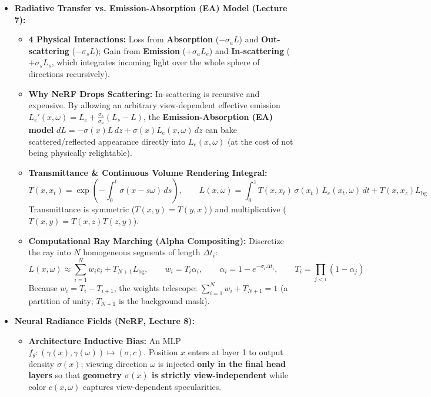 \documentclass[11pt,a4paper]{article}
\theoremstyle{definition}
\theoremstyle{plain}
\theoremstyle{remark}
\begin{document}
\begin{itemize}
    \item \textbf{Radiative Transfer vs. Emission-Absorption (EA) Model (Lecture 7):}
    \begin{itemize}
        \item \textbf{4 Physical Interactions:} Loss from \textbf{Absorption} ($-\sigma_a L$) and \textbf{Out-scattering} ($-\sigma_s L$); Gain from \textbf{Emission} ($+\sigma_a L_e$) and \textbf{In-scattering} ($+\sigma_s L_s$, which integrates incoming light over the whole sphere of directions recursively).
        \item \textbf{Why NeRF Drops Scattering:} In-scattering is recursive and expensive. By allowing an arbitrary view-dependent effective emission $L_e'(x, \omega) = L_e + \frac{\sigma_s}{\sigma_a}(L_s - L)$, the \textbf{Emission-Absorption (EA) model} $dL = -\sigma(x)L\,dz + \sigma(x)L_e(x,\omega)\,dz$ can bake scattered/reflected appearance directly into $L_e(x,\omega)$ (at the cost of not being physically relightable).
        \item \textbf{Transmittance \& Continuous Volume Rendering Integral:}
        $$T(x, x_t) = \exp\!\left(-\int_0^t \sigma(x - s\omega)\,ds\right), \qquad L(x, \omega) = \int_0^z T(x, x_t)\,\sigma(x_t)\,L_e(x_t, \omega)\,dt + T(x, x_z)L_{\text{bg}}$$
        Transmittance is symmetric ($T(x,y)=T(y,x)$) and multiplicative ($T(x,y)=T(x,z)T(z,y)$).
        \item \textbf{Computational Ray Marching (Alpha Compositing):} Discretize the ray into $N$ homogeneous segments of length $\Delta t_i$:
        $$L(x,\omega) \approx \sum_{i=1}^N w_i c_i + T_{N+1} L_{\text{bg}}, \qquad w_i = T_i \alpha_i, \qquad \alpha_i = 1 - e^{-\sigma_i \Delta t_i}, \qquad T_i = \prod_{j<i}(1 - \alpha_j)$$
        Because $w_i = T_i - T_{i+1}$, the weights telescope: $\sum_{i=1}^N w_i + T_{N+1} = 1$ (a partition of unity; $T_{N+1}$ is the background mask).
    \end{itemize}
    \item \textbf{Neural Radiance Fields (NeRF, Lecture 8):}
    \begin{itemize}
        \item \textbf{Architecture Inductive Bias:} An MLP $f_\theta: (\gamma(x), \gamma(\omega)) \mapsto (\sigma, c)$. Position $x$ enters at layer 1 to output density $\sigma(x)$; viewing direction $\omega$ is injected \textbf{only in the final head layers} so that \textbf{geometry $\sigma(x)$ is strictly view-independent} while color $c(x,\omega)$ captures view-dependent specularities.

\end{itemize}
\end{itemize}
\end{document}

